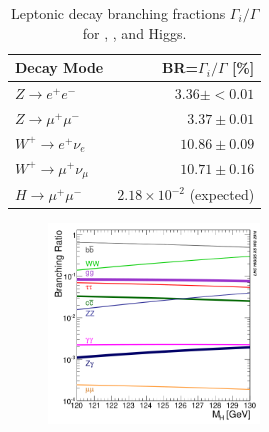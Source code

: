 \begin{table}[htp]
\begin{center}
{\footnotesize
\begin{tabular}{l r}
\toprule
Decay Mode & BR=$\Gamma_i/\Gamma$ [\%] \\
\midrule
$Z\to e^+e^-$           & $3.36\pm<0.01$ \\
$Z\to \mu^+\mu^-$       & $3.37\pm0.01 $ \\
$W^+\to   e^+\nu_e$     & $10.86\pm0.09$ \\
$W^+\to \mu^+\nu_\mu$   & $10.71\pm0.16$ \\
$H\to \mu^+\mu^-$       & $2.18\times10^{-2}$ (expected) \\
\bottomrule
\end{tabular}
}
\caption{Leptonic decay branching fractions $\Gamma_i/\Gamma$ for \W, \Z, and Higgs. \cite{pdg2018}}
\label{tab:decayCrossSec}
\end{center}
\end{table}

\begin{figure}[h!]
\captionsetup[subfigure]{position=b}
\centering
\includegraphics[width=0.5\textwidth]{figures/pheno/higgsBr.png}
\caption{}
\label{fig:higgsBr}
\end{figure}

